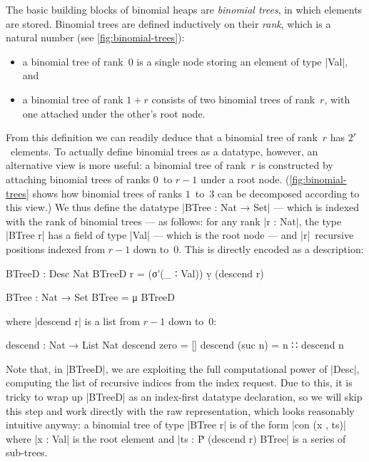 The basic building blocks of binomial heaps are \emph{binomial trees}, in which elements are stored.
Binomial trees are defined inductively on their \emph{rank}, which is a natural number (see \autoref{fig:binomial-trees}):
\begin{itemize}
\item a binomial tree of rank~$0$ is a single node storing an element of type |Val|, and
\item a binomial tree of rank $1+r$ consists of two binomial trees of rank~$r$, with one attached under the other's root node.
\end{itemize}
From this definition we can readily deduce that a binomial tree of rank~$r$ has $2^r$~elements.
To actually define binomial trees as a datatype, however, an alternative view is more useful: a binomial tree of rank~$r$ is constructed by attaching binomial trees of ranks $0$~to $r-1$ under a root node.
(\autoref{fig:binomial-trees} shows how binomial trees of ranks $1$~to~$3$ can be decomposed according to this view.)
We thus define the datatype |BTree : Nat → Set| --- which is indexed with the rank of binomial trees --- as follows: for any rank |r : Nat|, the type |BTree r| has a field of type |Val| --- which is the root node --- and |r|~recursive positions indexed from $r-1$ down to~$0$.
This is directly encoded as a description:
\begin{code}
BTreeD : Desc Nat
BTreeD r = (σ'(_ ∶ Val)) ṿ (descend r)

BTree : Nat → Set
BTree = μ BTreeD
\end{code}
where |descend r| is a list from $r-1$ down to~$0$:
\begin{code}
descend : Nat → List Nat
descend zero     =  []
descend (suc n)  =  n ∷ descend n
\end{code}
Note that, in |BTreeD|, we are exploiting the full computational power of |Desc|, computing the list of recursive indices from the index request.
Due to this, it is tricky to wrap up |BTreeD| as an index-first datatype declaration, so we will skip this step and work directly with the raw representation, which looks reasonably intuitive anyway: a binomial tree of type |BTree r| is of the form |con (x , ts)| where |x : Val| is the root element and |ts : Ṗ (descend r) BTree| is a series of sub-trees.

